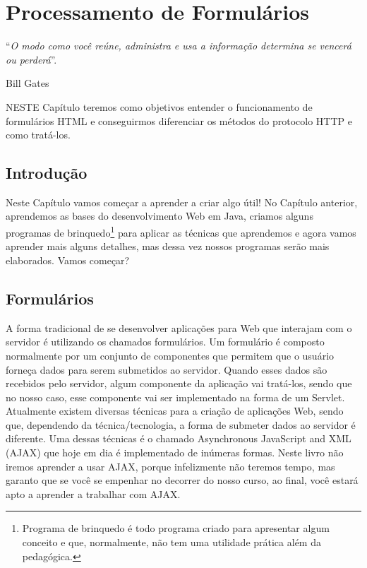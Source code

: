\chapter{Processamento de Formulários}
\epigraph{``\textit{O modo como você reúne, administra e usa a informação determina se vencerá ou perderá}''.}{Bill Gates}

\lettrine[lines=4, lhang=0.1, lraise=0, loversize=0.2, findent=0.1em]{\textcolor{corAzulTema}{N}}{ESTE} Capítulo teremos como objetivos entender o funcionamento de formulários HTML e conseguirmos diferenciar os métodos do protocolo HTTP e como tratá-los.


\section{Introdução}

Neste Capítulo vamos começar a aprender a criar algo útil! No Capítulo anterior, aprendemos as bases do desenvolvimento Web em Java, criamos alguns programas de brinquedo\footnote{Programa de brinquedo é todo programa criado para apresentar algum conceito e que, normalmente, não tem uma utilidade prática além da pedagógica.} para aplicar as técnicas que aprendemos e agora vamos aprender mais alguns detalhes, mas dessa vez nossos programas serão mais elaborados. Vamos começar?


\section{Formulários}

A forma tradicional de se desenvolver aplicações para Web que interajam com o servidor é utilizando os chamados formulários. Um formulário é composto normalmente por um conjunto de componentes que permitem que o usuário forneça dados para serem submetidos ao servidor. Quando esses dados são recebidos pelo servidor, algum componente da aplicação vai tratá-los, sendo que no nosso caso, esse componente vai ser implementado na forma de um Servlet.
Atualmente existem diversas técnicas para a criação de aplicações Web, sendo que, dependendo da técnica/tecnologia, a forma de submeter dados ao servidor é diferente. Uma dessas técnicas é o chamado Asynchronous JavaScript and XML (AJAX) que hoje em dia é implementado de inúmeras formas. Neste livro não iremos aprender a usar AJAX, porque infelizmente não teremos tempo, mas garanto que se você se empenhar no decorrer do nosso curso, ao final, você estará apto a aprender a trabalhar com AJAX.

